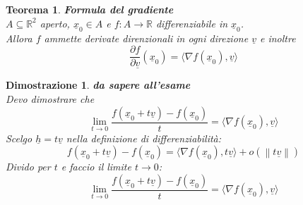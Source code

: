 \documentclass[10pt,landscape, a4paper]{article}
\newtheorem{teorema}{Teorema}
\newenvironment{thm}{\begin{mdframed}[backgroundcolor=white]\begin{teorema}}{\end{teorema}\end{mdframed}}
\newtheorem{demnstrn}{Dimostrazione}
\newenvironment{dimostrazione}{\begin{mdframed}[backgroundcolor=white]\begin{demnstrn}}{\end{demnstrn}\end{mdframed}}
\begin{document}
\begin{multicols}{3}
\begin{thm} \textbf{Formula del gradiente}\\
	$A \subseteq \mathbb{R}^2$ aperto, $\underline{x}_0 \in A$ e $f: A \to \mathbb{R}$ differenziabile in $\underline{x}_0$.\\
	Allora $f$ ammette derivate direnzionali in ogni direzione $\underline{v}$ e inoltre
	\begin{equation}
		\frac{\partial f}{\partial \underline{v}} (\underline{x}_0) = \langle \nabla f(\underline{x}_0), \underline{v} \rangle
	\end{equation}
\end{thm}
\begin{dimostrazione}
	\emph{\textbf{da sapere all'esame}}\\
	Devo dimostrare che 
	\begin{equation}
		\lim_{t \to 0} \frac{f(\underline{x}_0 +t\underline{v})-f(\underline{x}_0)}{t} = \langle \nabla f(\underline{x}_0), \underline{v} \rangle
	\end{equation}
	Scelgo $\underline{h} = t \underline{v}$ nella definizione di differenziabilità:
	\begin{equation}
		f(\underline{x}_0 +t\underline{v})-f(\underline{x}_0) = \langle \nabla f(\underline{x}_0), t \underline{v} \rangle + o(\left\lVert t\underline{v}\right\rVert )
	\end{equation}
	Divido per $t$ e faccio il limite $t \to 0$:
	\begin{equation}
		\lim_{t \to 0} \frac{f(\underline{x}_0 +t\underline{v})-f(\underline{x}_0)}{t} = \langle \nabla f(\underline{x}_0), \underline{v} \rangle
	\end{equation}
\end{dimostrazione}






\end{multicols}
\end{document}
